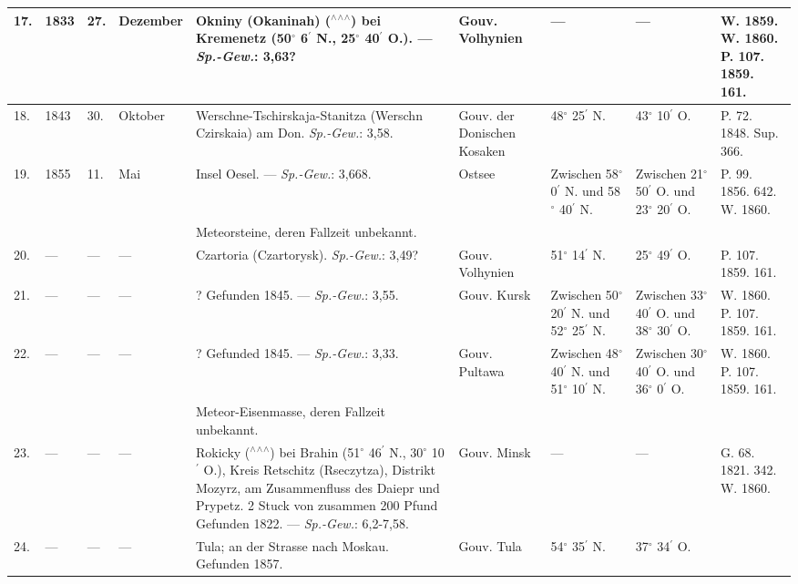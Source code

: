 \documentclass[a4paper, 8pt, oneside, polutonikogreek, german]{article}
\begin{document}
\begin{center}
\begin{longtable}{|p{3mm}|p{13mm}|p{5mm}|p{16mm}|p{25mm}|p{16mm}|p{13mm}|p{13mm}|p{13mm}|}
        17. & 1833 & 27. & Dezember & Okniny (Okaninah) ($^\wedge$$^\wedge$$^\wedge$) bei Kremenetz (50$^\circ$ 6$^\prime$ N., 25$^\circ$ 40$^\prime$ O.). --- \emph{Sp.-Gew.}: 3,63? & Gouv. Volhynien & --- & --- & W. 1859. W. 1860. P. 107. 1859. 161. \\ \hline
        18. & 1843 & 30. & Oktober & Werschne-Tschirskaja-Stanitza (Werschn Czirskaia) am Don. \emph{Sp.-Gew.}: 3,58. & Gouv. der Donischen Kosaken & 48$^\circ$ 25$^\prime$ N. & 43$^\circ$ 10$^\prime$ O. & P. 72. 1848. Sup. 366. \\ \hline
        19. & 1855 & 11. & Mai & Insel Oesel. --- \emph{Sp.-Gew.}: 3,668. & Ostsee & Zwischen 58$^\circ$ 0$^\prime$ N. und 58$^\circ$ 40$^\prime$ N. & Zwischen 21$^\circ$ 50$^\prime$ O. und 23$^\circ$ 20$^\prime$ O. & P. 99. 1856. 642. W. 1860. \\ \hline
          &   &   &   & Meteorsteine, deren Fallzeit unbekannt. &   &   &   &   \\ \hline
        20. & --- & --- & --- & Czartoria (Czartorysk). \emph{Sp.-Gew.}: 3,49? & Gouv. Volhynien & 51$^\circ$ 14$^\prime$ N. & 25$^\circ$ 49$^\prime$ O. & P. 107. 1859. 161. \\ \hline
        21. & --- & --- & --- & ? Gefunden 1845. --- \emph{Sp.-Gew.}: 3,55. & Gouv. Kursk & Zwischen 50$^\circ$ 20$^\prime$ N. und 52$^\circ$ 25$^\prime$ N. & Zwischen 33$^\circ$ 40$^\prime$ O. und 38$^\circ$ 30$^\prime$ O. & W. 1860. P. 107. 1859. 161. \\ \hline
        22. & --- & --- & --- & ? Gefunded 1845. --- \emph{Sp.-Gew.}: 3,33. & Gouv. Pultawa & Zwischen 48$^\circ$ 40$^\prime$ N. und 51$^\circ$ 10$^\prime$ N. & Zwischen 30$^\circ$ 40$^\prime$ O. und 36$^\circ$ 0$^\prime$ O. & W. 1860. P. 107. 1859. 161. \\ \hline
          &   &   &   & Meteor-Eisenmasse, deren Fallzeit unbekannt. &   &   &   &   \\ \hline
        23. & --- & --- & --- & Rokicky ($^\wedge$$^\wedge$$^\wedge$) bei Brahin (51$^\circ$ 46$^\prime$ N., 30$^\circ$ 10$^\prime$ O.), Kreis Retschitz (Rseczytza), Distrikt Mozyrz, am Zusammenfluss des Daiepr und Prypetz. 2 Stuck von zusammen 200 Pfund Gefunden 1822. --- \emph{Sp.-Gew.}: 6,2-7,58. & Gouv. Minsk & --- & --- & G. 68. 1821. 342. W. 1860. \\ \hline
        24. & --- & --- & --- & Tula; an der Strasse nach Moskau. Gefunden 1857. & Gouv. Tula & 54$^\circ$ 35$^\prime$ N. & 37$^\circ$ 34$^\prime$ O. & \\ \hline
    \end{longtable}
\end{center}
\clearpage
\end{document}
